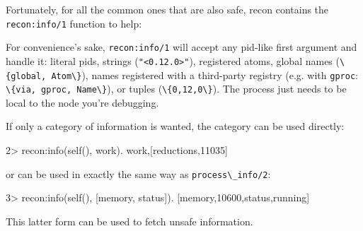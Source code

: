 \documentclass[11pt, oneside]{book}   	%
\newcommand{\otpapp}[1]{\Verb`#1`}
\newcommand{\function}[1]{\Verb`#1`}
\newcommand{\expression}[1]{\Verb`#1`}
\begin{document}
Fortunately, for all the common ones that are also safe, recon contains the \expression{recon:info/1} function to help:


For convenience's sake, \expression{recon:info/1} will accept any pid-like first argument and handle it: literal pids, strings (\expression{"<0.12.0>"}), registered atoms, global names (\expression{\{global, Atom\}}), names registered with a third-party registry (e.g. with \otpapp{gproc}: \expression{\{via, gproc, Name\}}), or tuples (\expression{\{0,12,0\}}). The process just needs to be local to the node you're debugging.

If only a category of information is wanted, the category can be used directly:

\begin{VerbatimEshell}
2> recon:info(self(), work).
{work,[{reductions,11035}]}
\end{VerbatimEshell}

or can be used in exactly the same way as \function{process\_info/2}:

\begin{VerbatimEshell}
3> recon:info(self(), [memory, status]).
[{memory,10600},{status,running}]
\end{VerbatimEshell}

This latter form can be used to fetch unsafe information.
\end{document}
